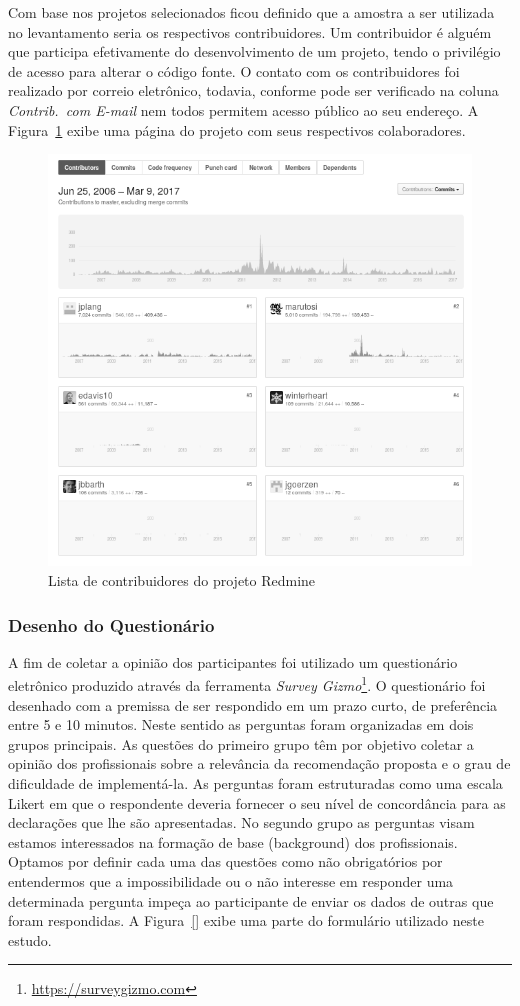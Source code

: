 Com base nos projetos selecionados ficou definido que a amostra a ser utilizada
no levantamento seria os respectivos contribuidores. Um contribuidor é alguém
que participa efetivamente do desenvolvimento de um projeto, tendo o privilégio
de acesso para alterar o código fonte. O contato com os contribuidores foi
realizado por correio eletrônico, todavia, conforme pode ser verificado na
coluna \textit{Contrib.\ com E-mail} nem todos permitem acesso público ao seu
endereço. A Figura~\ref{fig:redmine_contribuidores} exibe uma página do projeto
com seus respectivos colaboradores.

\begin{figure}[htpb]
	\centering
	\includegraphics[width=0.8\linewidth]{./chapter-sugestoes-melhorias-fgrm/img/redmine_contribuidores.png}
	\caption{Lista de contribuidores do projeto Redmine}
\label{fig:redmine_contribuidores}
\end{figure}

\subsubsection{Desenho do Questionário}
\label{ssub:sug_melhoria_desenho_questionario}

A fim de coletar a opinião dos participantes foi utilizado um questionário
eletrônico produzido através da ferramenta \textit{Survey
	Gizmo}\footnote{\url{https://surveygizmo.com}}. O questionário foi desenhado
com a premissa de ser respondido em um prazo curto, de preferência entre 5 e 10
minutos. Neste sentido as perguntas foram organizadas em dois grupos principais.
As questões do primeiro grupo têm por objetivo coletar a opinião dos
profissionais sobre a relevância da recomendação proposta e o grau de
dificuldade de implementá-la. As perguntas foram estruturadas como uma escala
Likert em que o respondente deveria fornecer o seu nível de concordância para as
declarações que lhe são apresentadas. No segundo grupo as perguntas visam
estamos interessados na formação de base (background) dos profissionais. Optamos
por definir cada uma das questões como não obrigatórios por entendermos que a
impossibilidade ou o não interesse em responder uma determinada pergunta impeça
ao participante de enviar os dados de outras que foram respondidas. A
Figura~\ref{} exibe uma parte do formulário utilizado neste estudo.

